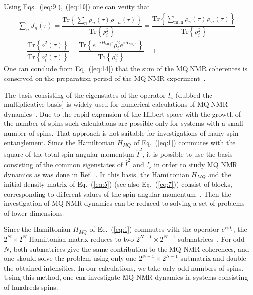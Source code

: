 %
Using Eqs.~(\ref{eq:9}),~(\ref{eq:10}) one can verity that
%
\begin{multline}
    \label{eq:14}
    \sum\limits_{n} J_{n}(\tau)
    = \dfrac{
        \mathrm{Tr} \left\{
            \sum_{n} \rho_{n}(\tau) \rho_{-n}(\tau)
        \right\}}
    {\mathrm{Tr} \left\{ \rho^2_{i} \right\}}
    = \dfrac{
        \mathrm{Tr} \left\{
            \sum_{\mathrm{m,n}} \rho_n(\tau)\rho_m(\tau)
    \right\}}
    {\mathrm{Tr} \left\{\rho^2_{i}\right\}}
    \\
    = \dfrac{
        \mathrm{Tr}\left\{\rho^2(\tau)\right\}
    }
    {
        \mathrm{Tr}\left\{\rho^2_{i}(\tau)\right\}
    }
    = \dfrac{
        \mathrm{Tr} \left\{
            e^{-i H_\mathrm{MQ} \tau}
            \rho^{2}_{i}
            e^{i H_\mathrm{MQ} \tau}
        \right\}
    }
    {
        \mathrm{Tr} \left\{ \rho_{i}^{2} \right\}
    }
    = 1
\end{multline}
%
One can conclude from Eq.~(\ref{eq:14}) that the sum of the MQ NMR coherences is conserved on the preparation period of the MQ NMR experiment~\cite{Baum_1985}.

The basis consisting of the eigenstates of the operator $I_\mathrm{z}$ (dubbed the multiplicative basis) is widely used for numerical calculations of MQ NMR dynamics~\cite{Zhang_2009}.
Due to the rapid expansion of the Hilbert space with the growth of the number of spins such calculations are possible only for systems with a small number of spins.
That approach is not suitable for investigations of many-spin entanglement.
Since the Hamiltonian $H_{MQ}$ of Eq.~(\ref{eq:1}) commutes with the square of the total spin angular momentum $\hat I^2$,
it is possible to use the basis consisting of the common eigenstates of $\hat I^2$ and $I_\mathrm{z}$ in order to study MQ NMR dynamics as was done in Ref.~\cite{Doronin_2009,Doronin_2011,Doronin_2019}.
In this basis, the Hamiltonian $H_{MQ}$ and the initial density matrix of Eq.~(\ref{eq:5}) (see also Eq.~(\ref{eq:7})) consist of blocks, corresponding to different values of the spin angular momentum~\cite{Doronin_2009}.
Then the investigation of MQ NMR dynamics can be reduced to solving a set of problems of lower dimensions.

Since the Hamiltonian $H_{MQ}$ of Eq.~(\ref{eq:1}) commutes with the operator $e^{i\pi I_\mathrm{z}}$, the $2^N \times 2^N$ Hamiltonian matrix reduces to two $2^{N-1} \times 2^{N-1}$ submatrices~\cite{Doronin_2009}.
For odd $N$, both submatrices give the same contribution to the MQ NMR coherences, and one should solve the problem using only one $2^{N-1} \times 2^{N-1}$ submatrix and double the obtained intensities.
In our calculations, we take only odd numbers of spins.
Using this method, one can investigate MQ NMR dynamics in systems consisting of hundreds spins.

